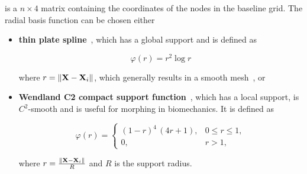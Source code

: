 is a $n\times 4$ matrix containing the coordinates of the nodes in the baseline grid. The radial basis function can be chosen either

\begin{itemize}
\item \textbf{thin plate spline}~\cite{Skala:2016}, which has a global support and is defined as 

\begin{equation}
\varphi(r)=r^2\log{r}
\end{equation}

where $r=\|{\bf X}-{\bf X}_i\|$, which generally results in a smooth mesh~\cite{Hwang:2016}, or
\item \textbf{Wendland C2 compact support function}~\cite{Wendland:1995}, which has a local support, is $C^2$-smooth and is useful for morphing in biomechanics. It is defined as

\begin{equation}
\varphi(r) = 
\begin{cases} 
(1 - r)^4 \,(4 r + 1), & 0 \le r \le 1, \\
0, & r > 1,
\end{cases}
\end{equation}

where $r = \frac{\|{\bf X}-{\bf X}_i\|}{R}$ and $R$ is the support radius.
\end{itemize}
